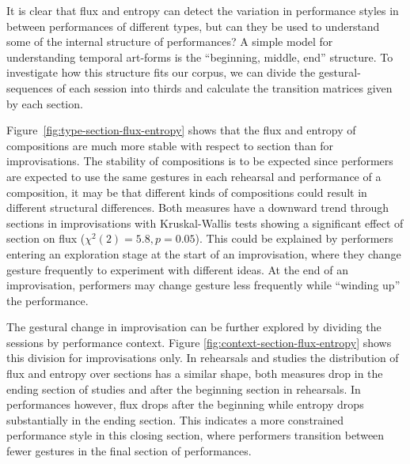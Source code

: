 \documentclass{sigchi}
\begin{document}
It is clear that flux and entropy can detect the variation in
performance styles in between performances of different types, but can
they be used to understand some of the internal structure of
performances? A simple model for understanding temporal art-forms is
the ``beginning, middle, end'' structure. To investigate how this
structure fits our corpus, we can divide the gestural-sequences of
each session into thirds and calculate the transition matrices given
by each section.

Figure~\ref{fig:type-section-flux-entropy} shows that the flux and
entropy of compositions are much more stable with respect to section
than for improvisations. The stability of compositions is to be
expected since performers are expected to use the same gestures in
each rehearsal and performance of a composition, it may be that
different kinds of compositions could result in different structural
differences. Both measures have a downward trend through sections in
improvisations with Kruskal-Wallis tests showing a significant effect
of section on flux ($\chi^2(2)=5.8, p=0.05$). This could be explained
by performers entering an exploration stage at the start of an
improvisation, where they change gesture frequently to experiment with
different ideas. At the end of an improvisation, performers may change
gesture less frequently while ``winding up'' the performance.

The gestural change in improvisation can be further explored by
dividing the sessions by performance context. Figure
\ref{fig:context-section-flux-entropy} shows this division for
improvisations only. In rehearsals and studies the distribution of
flux and entropy over sections has a similar shape, both measures drop
in the ending section of studies and after the beginning section in
rehearsals. In performances however, flux drops after the beginning
while entropy drops substantially in the ending section. This
indicates a more constrained performance style in this closing
section, where performers transition between fewer gestures in the
final section of performances.


\end{document}
